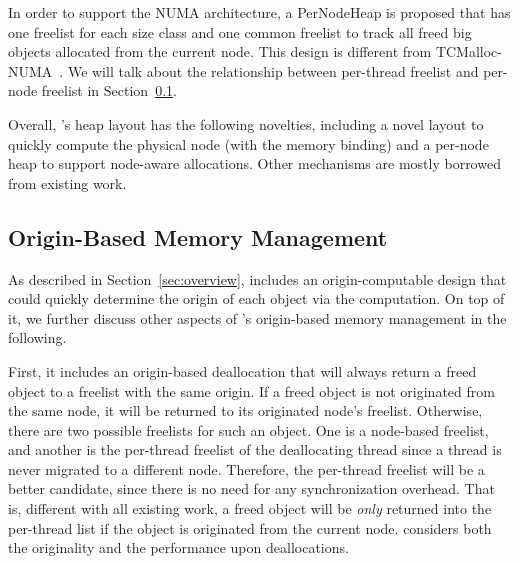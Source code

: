 In order to support the NUMA architecture, a PerNodeHeap is proposed that has one freelist for each size class and one common freelist to track all freed big objects allocated from the current node. This design is different from TCMalloc-NUMA~\cite{tcmallocnew}. We will talk about the relationship between per-thread freelist and per-node freelist in Section~\ref{sec:origin}. 

Overall, \NM{}'s heap layout has the following novelties, including a novel layout to quickly compute the physical node (with the memory binding) and a per-node heap to support node-aware allocations. Other mechanisms are mostly borrowed from existing work.

\subsection{Origin-Based Memory Management} 
\label{sec:origin}

As described in Section~\ref{sec:overview}, \NM{} includes an origin-computable design that could quickly determine the origin of each object via the computation. On top of it, we further discuss other aspects of \NM{}'s origin-based memory management in the following.  

First, it includes an origin-based deallocation that will always return a freed object to a freelist with the same origin. If a freed object is not originated from the same node, it will be returned to its originated node's  freelist. Otherwise, there are two possible freelists for such an object. One is a node-based freelist, and another is the per-thread freelist of the deallocating thread since a thread is never migrated to a different node. Therefore, the per-thread freelist will be a better candidate, since there is no need for any synchronization overhead. That is, different with all existing work, a freed object will be \textit{only} returned into the per-thread list if the object is originated from the current node. \NM{} considers both the originality and the performance upon deallocations.   

